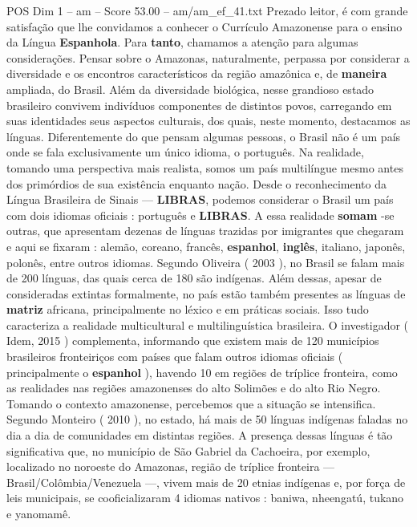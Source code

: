 \begin{textsample}{POS Dim 1 – am – Score 53.00 – am/am\_ef\_41.txt}  \label{ex:f1_pos_224}
Prezado leitor, é com grande satisfação que lhe convidamos a conhecer o Currículo Amazonense para o ensino da Língua \textbf{Espanhola}.
Para \textbf{tanto}, chamamos a atenção para algumas considerações.
Pensar sobre o Amazonas, naturalmente, perpassa por considerar a diversidade e os encontros característicos da região amazônica e, de \textbf{maneira} ampliada, do Brasil.
Além da diversidade biológica, nesse grandioso estado brasileiro convivem indivíduos componentes de distintos povos, carregando em suas identidades seus aspectos culturais, dos quais, neste momento, destacamos as línguas.
Diferentemente do que pensam algumas pessoas, o Brasil não é um país onde se fala exclusivamente um único idioma, o português.
Na realidade, tomando uma perspectiva mais realista, somos um país multilíngue mesmo antes dos primórdios de sua existência enquanto nação.
Desde o reconhecimento da Língua Brasileira de Sinais — \textbf{LIBRAS}, podemos considerar o Brasil um país com dois idiomas oficiais : português e \textbf{LIBRAS}.
A essa realidade \textbf{somam} -se outras, que apresentam dezenas de línguas trazidas por imigrantes que chegaram e aqui se fixaram : alemão, coreano, francês, \textbf{espanhol}, \textbf{inglês}, italiano, japonês, polonês, entre outros idiomas.
Segundo Oliveira ( 2003 ), no Brasil se falam mais de 200 línguas, das quais cerca de 180 são indígenas.
Além dessas, apesar de consideradas extintas formalmente, no país estão também presentes as línguas de \textbf{matriz} africana, principalmente no léxico e em práticas sociais.
Isso tudo caracteriza a realidade multicultural e multilinguística brasileira.
O investigador ( Idem, 2015 ) complementa, informando que existem mais de 120 municípios brasileiros fronteiriços com países que falam outros idiomas oficiais ( principalmente o \textbf{espanhol} ), havendo 10 em regiões de tríplice fronteira, como as realidades nas regiões amazonenses do alto Solimões e do alto Rio Negro.
Tomando o contexto amazonense, percebemos que a situação se intensifica.
Segundo Monteiro ( 2010 ), no estado, há mais de 50 línguas indígenas faladas no dia a dia de comunidades em distintas regiões.
A presença dessas línguas é tão significativa que, no município de São Gabriel da Cachoeira, por exemplo, localizado no noroeste do Amazonas, região de tríplice fronteira — Brasil/Colômbia/Venezuela —, vivem mais de 20 etnias indígenas e, por força de leis municipais, se cooficializaram 4 idiomas nativos : baniwa, nheengatú, tukano e yanomamê.

\end{textsample}

